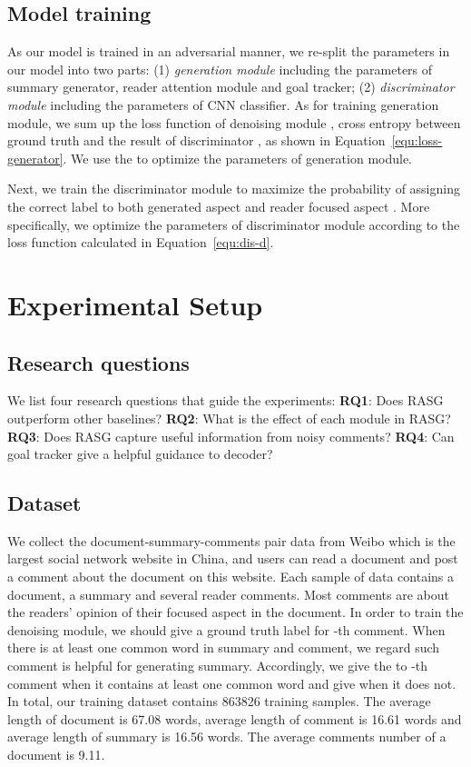 \documentclass[letterpaper]{article} \usepackage{aaai19}  \usepackage{times}  \usepackage{helvet}  \usepackage{courier}
\begin{document}
\subsection{Model training}

As our model is trained in an adversarial manner, we re-split the parameters in our model into two parts: (1) \textit{generation module} including the parameters of summary generator, reader attention module and goal tracker; (2) \textit{discriminator module} including the parameters of CNN classifier.
As for training generation module, we sum up the loss function of denoising module , cross entropy between ground truth  and the result of discriminator , as shown in Equation~\ref{equ:loss-generator}.
We use the  to optimize the parameters of generation module.

Next, we train the discriminator module to maximize the probability of assigning the correct label to both generated aspect  and reader focused aspect .
More specifically, we optimize the parameters of discriminator module according to the loss function  calculated in Equation~\ref{equ:dis-d}.

\section{Experimental Setup}

\subsection{Research questions}

We list four research questions that guide the experiments: 
\noindent \textbf{RQ1}: Does RASG outperform other baselines?
\noindent \textbf{RQ2}: What is the effect of each module in RASG? 
\noindent \textbf{RQ3}: Does RASG capture useful information from noisy comments?
\noindent \textbf{RQ4}: Can goal tracker give a helpful guidance to decoder?


\subsection{Dataset}

We collect the document-summary-comments pair data from Weibo which is the largest social network website in China, and users can read a document and post a comment about the document on this website.
Each sample of data contains a document, a summary and several reader comments.
Most comments are about the readers' opinion of their focused aspect in the document.
In order to train the denoising module, we should give a ground truth label  for -th comment.
When there is at least one common word in summary and comment, we regard such comment is helpful for generating summary.
Accordingly, we give the  to -th comment when it contains at least one common word and give  when it does not.
In total, our training dataset contains 863826 training samples.
The average length of document is 67.08 words, average length of comment is 16.61 words and average length of summary is 16.56 words.
The average comments number of a document is 9.11.
\end{document}
